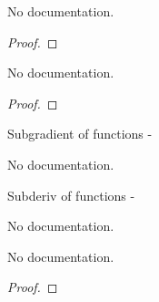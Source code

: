 \begin{theorem}\label{Banach_SubderivWithinAt.Nonempty}
        \leanok
                No documentation.
    \end{theorem}

\begin{proof}
    \leanok
\end{proof}

\begin{theorem}\label{Quasiconvex_first_order_condition_right}
        \leanok
                No documentation.
    \end{theorem}

\begin{proof}
    \leanok
\end{proof}

\begin{definition}\label{HasSubgradientAt}
        \leanok
                Subgradient of functions -
    \end{definition}

\begin{definition}\label{HasSubgradientWithinAt}
        \leanok
                No documentation.
    \end{definition}

\begin{definition}\label{SubderivAt}
        \leanok
                Subderiv of functions -
    \end{definition}

\begin{definition}\label{SubderivWithinAt}
        \leanok
                No documentation.
    \end{definition}

\begin{theorem}\label{mem_SubderivAt}
        \leanok
                No documentation.
    \end{theorem}

\begin{proof}
    \leanok
\end{proof}

